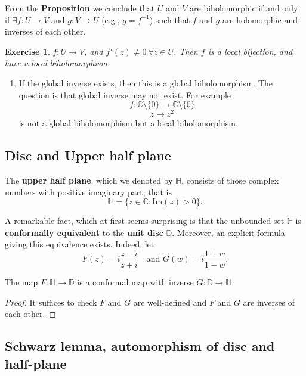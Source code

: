 \documentclass{article}
\newtheorem{exercise}{Exercise}
\begin{document}
\begin{remark}
From the \textbf{Proposition} we conclude that $U$ and $V$ are biholomorphic if and only if $\exists f: U \to V$ and $g: V \to U$ (e.g., $g = f^{-1}$) such that $f$ and $g$ are holomorphic and inverses of each other.
\end{remark}

\begin{exercise}
$f: U \to V$, and $f'(z) \ne 0 \ \forall z \in U$. Then $f$ is a local bijection, and have a local biholomorphism.
\end{exercise}
\begin{enumerate}
    \item If the global inverse exists, then this is a global biholomorphism. The question is that global inverse may not exist. For example
    $$f: \mathbb{C} \setminus \{0\} \to \mathbb{C} \setminus \{0\}$$
    $$z \mapsto z^2$$
    is not a global biholomorphism
    but a local biholomorphism.
\end{enumerate}

\subsection*{Disc and Upper half plane}

The \textbf{upper half plane}, which we denoted by $\mathbb{H}$, consists of those complex numbers with positive imaginary part; that is
$$\mathbb{H} = \{z \in \mathbb{C} : \text{Im}(z) > 0\}.$$

A remarkable fact, which at first seems surprising is that the unbounded set $\mathbb{H}$ is \textbf{conformally equivalent} to the \textbf{unit disc} $\mathbb{D}$. Moreover, an explicit formula giving this equivalence exists. Indeed, let
$$F(z) = i \frac{z-i}{z+i} \quad \text{and } G(w) = i \frac{1+w}{1-w}.$$

\begin{theorem}
The map $F: \mathbb{H} \to \mathbb{D}$ is a conformal map with inverse $G: \mathbb{D} \to \mathbb{H}$.
\end{theorem}

\begin{proof}
It suffices to check $F$ and $G$ are well-defined and $F$ and $G$ are inverses of each other.
\end{proof}

\subsection*{Schwarz lemma, automorphism of disc and half-plane}
\end{document}
